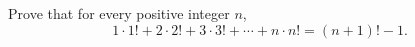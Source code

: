 Prove that for every positive integer $n$,
\[
1\cdot1!+2\cdot2!+3\cdot3!+\cdots+n\cdot n!=(n+1)!-1 .
\]
